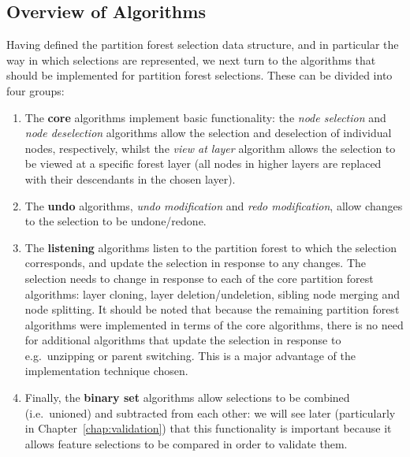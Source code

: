 \subsection{Overview of Algorithms}

Having defined the partition forest selection data structure, and in particular the way in which selections are represented, we next turn to the algorithms that should be implemented for partition forest selections. These can be divided into four groups:

\begin{enumerate}

\item The \textbf{core} algorithms implement basic functionality: the \emph{node selection} and \emph{node deselection} algorithms allow the selection and deselection of individual nodes, respectively, whilst the \emph{view at layer} algorithm allows the selection to be viewed at a specific forest layer (all nodes in higher layers are replaced with their descendants in the chosen layer).

\item The \textbf{undo} algorithms, \emph{undo modification} and \emph{redo modification}, allow changes to the selection to be undone/redone.

\item The \textbf{listening} algorithms listen to the partition forest to which the selection corresponds, and update the selection in response to any changes. The selection needs to change in response to each of the core partition forest algorithms: layer cloning, layer deletion/undeletion, sibling node merging and node splitting. It should be noted that because the remaining partition forest algorithms were implemented in terms of the core algorithms, there is no need for additional algorithms that update the selection in response to e.g.~unzipping or parent switching. This is a major advantage of the implementation technique chosen.

\item Finally, the \textbf{binary set} algorithms allow selections to be combined (i.e.~unioned) and subtracted from each other: we will see later (particularly in Chapter~\ref{chap:validation}) that this functionality is important because it allows feature selections to be compared in order to validate them.

\end{enumerate}

